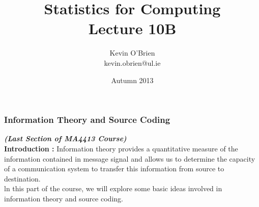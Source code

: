 \documentclass[a4]{beamer}
\title[MA4413]{Statistics for Computing \\ {\normalsize Lecture 10B}}
\author[Kevin O'Brien]{Kevin O'Brien \\ {\scriptsize kevin.obrien@ul.ie}}
\date{Autumn 2013}
\institute[Maths \& Stats]{Dept. of Mathematics \& Statistics, \\ University \textit{of} Limerick}
\begin{document}


\begin{frame}
\titlepage
\end{frame}
\begin{frame}
\frametitle{Information Theory and Source Coding}
\textbf{\textit{(Last Section of MA4413 Course)}}\\
\bigskip
\textbf{Introduction : } Information theory provides a quantitative measure of the information contained in message signal and allows us to determine the capacity of a communication system to transfer this information from source to destination. \\ \bigskip ln this part of the course, we will explore some basic ideas involved in information theory and source coding.
\end{frame}
\end{document}
